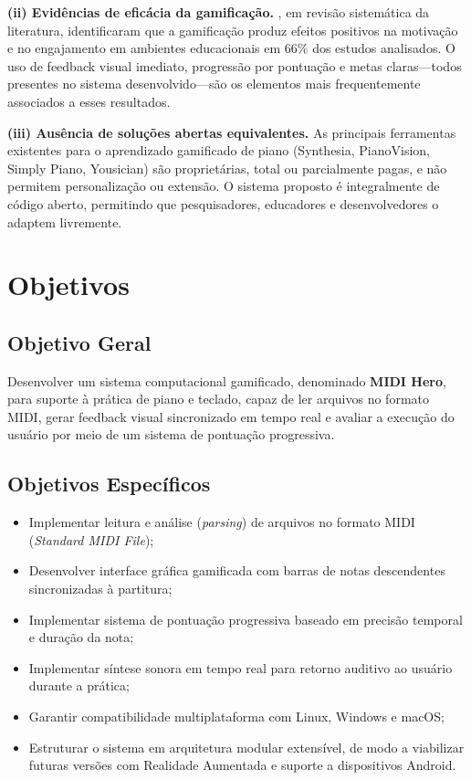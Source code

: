 \documentclass[
  12pt,
  openright,
  twoside,
  a4paper,
  english,
  brazil
]{abntex2}
\begin{document}
\textbf{(ii) Evidências de eficácia da gamificação.}
\textcite{hamari2014}, em revisão sistemática da literatura, identificaram
que a gamificação produz efeitos positivos na motivação e no engajamento
em ambientes educacionais em 66\% dos estudos analisados. O uso de
feedback visual imediato, progressão por pontuação e metas claras---todos
presentes no sistema desenvolvido---são os elementos mais frequentemente
associados a esses resultados.

\textbf{(iii) Ausência de soluções abertas equivalentes.}
As principais ferramentas existentes para o aprendizado gamificado de
piano (Synthesia, PianoVision\textregistered, Simply Piano, Yousician)
são proprietárias, total ou parcialmente pagas, e não permitem
personalização ou extensão. O sistema proposto é integralmente de código
aberto, permitindo que pesquisadores, educadores e desenvolvedores o
adaptem livremente.

\section{Objetivos}

\subsection{Objetivo Geral}

Desenvolver um sistema computacional gamificado, denominado
\textbf{MIDI Hero}, para suporte à prática de piano e teclado, capaz de
ler arquivos no formato MIDI, gerar feedback visual sincronizado em tempo
real e avaliar a execução do usuário por meio de um sistema de pontuação
progressiva.

\subsection{Objetivos Específicos}

\begin{itemize}
  \item Implementar leitura e análise (\textit{parsing}) de arquivos no
        formato MIDI (\textit{Standard MIDI File});
  \item Desenvolver interface gráfica gamificada com barras de notas
        descendentes sincronizadas à partitura;
  \item Implementar sistema de pontuação progressiva baseado em precisão
        temporal e duração da nota;
  \item Implementar síntese sonora em tempo real para retorno auditivo
        ao usuário durante a prática;
  \item Garantir compatibilidade multiplataforma com Linux, Windows e
        macOS;
  \item Estruturar o sistema em arquitetura modular extensível, de modo
        a viabilizar futuras versões com Realidade Aumentada e suporte a
        dispositivos Android.
\end{itemize}
\end{document}

